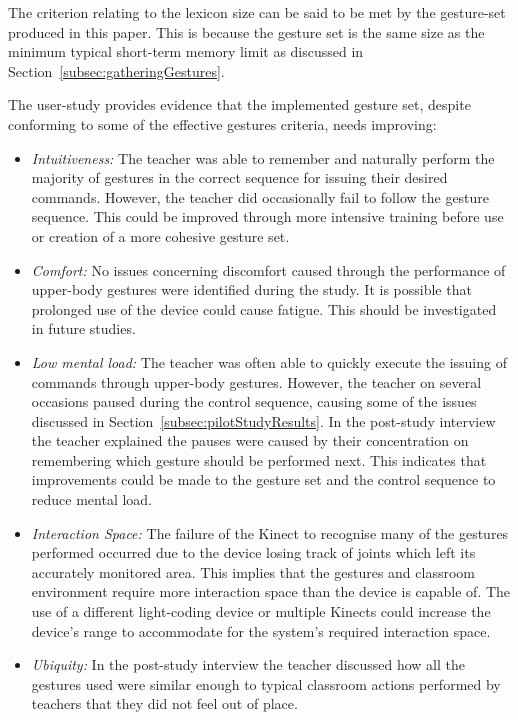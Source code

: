 \documentclass[link]{IWCOMP}
\begin{document}
   The criterion relating to the lexicon size can be said to be met by the gesture-set produced in this paper.
   This is because the gesture set is the same size as the minimum typical short-term memory limit as discussed in Section~\ref{subsec:gatheringGestures}.
   
   The user-study provides evidence that the implemented gesture set, despite conforming to some of the effective gestures criteria, needs improving:
   
   \begin{itemize}
   \item \textit{{Intuitiveness:}}  The teacher was able to remember and naturally perform the majority of gestures in the correct sequence for issuing their desired commands.
   However, the teacher did occasionally fail to follow the gesture sequence.
   This could be improved through more intensive training before use or creation of a more cohesive gesture set.
   \item \textit{{Comfort:}}  No issues concerning discomfort caused through the performance of upper-body gestures were identified during the study.
   It is possible that prolonged use of the device could cause fatigue.
   This should be investigated in future studies.
   \item \textit{{Low mental load:}}  The teacher was often able to quickly execute the issuing of commands through upper-body gestures.
   However, the teacher on several occasions paused during the control sequence, causing some of the issues discussed in Section~\ref{subsec:pilotStudyResults}.
   In the post-study interview the teacher explained the pauses were caused by their concentration on remembering which gesture should be performed next.
   This indicates that improvements could be made to the gesture set and the control sequence to reduce mental load.
   \item \textit{{Interaction Space:}} The failure of the Kinect to recognise many of the gestures performed occurred due to the device losing track of joints which left its accurately monitored area.
   This implies that the gestures and classroom environment require more interaction space than the device is capable of.
   The use of a different light-coding device or multiple Kinects could increase the device's range to accommodate for the system's required interaction space.
   \item \textit{{Ubiquity:}} In the post-study interview the teacher discussed how all the gestures used were similar enough to typical classroom actions performed by teachers that they did not feel out of place.\\ 
   \end{itemize}
\end{document}
